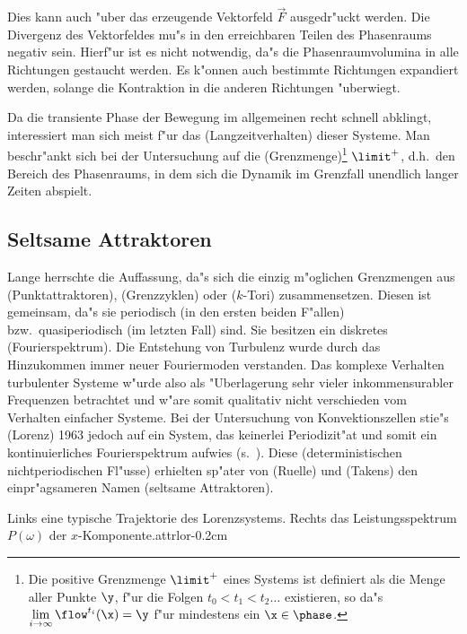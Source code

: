 Dies kann auch "uber das erzeugende Vektorfeld $\vec F$ ausgedr"uckt werden. Die Divergenz
des Vektorfeldes mu"s in den erreichbaren Teilen des Phasenraums negativ sein.
Hierf"ur ist es nicht notwendig, da"s die Phasenraumvolumina in alle Richtungen gestaucht
werden. Es k"onnen auch bestimmte Richtungen expandiert werden, solange die Kontraktion in
die anderen Richtungen "uberwiegt.

Da die transiente Phase der Bewegung im allgemeinen recht schnell abklingt, interessiert
man sich meist f"ur das \begriff(Langzeitverhalten) dieser Systeme. Man beschr"ankt sich bei
der Untersuchung auf die \begriff(Grenzmenge)\footnote{Die positive Grenzmenge $\limit^+$
eines Systems ist definiert als die Menge aller Punkte $\y$, f"ur die  
Folgen $t_0\lt t_1\lt t_2\dots$ existieren, so da"s $\lim\limits_{i\to\infty}\flow^{t_i}(\x)=\y$
f"ur mindestens ein $\x\in\phase$.} $\limit^+$, d.h.\   den Bereich des
Phasenraums, in dem sich die Dynamik im Grenzfall unendlich langer Zeiten abspielt. 

\subsection{Seltsame Attraktoren}
Lange herrschte die Auffassung, da"s sich die einzig m"oglichen Grenzmengen aus
\begriff(Punkt\-attraktoren), \begriff(Grenzzyklen) oder \begriff($k$-Tori)
zusammensetzen. Diesen ist gemeinsam, da"s sie periodisch (in den ersten beiden F"allen)
bzw.\ quasiperiodisch (im letzten Fall) sind. Sie besitzen ein diskretes \begriff(Fourierspektrum).
Die Entstehung von Turbulenz wurde durch das Hinzukommen immer neuer
Fouriermoden verstanden. Das komplexe Verhalten turbulenter Systeme w"urde also als "Uberlagerung
sehr vieler inkommensurabler Frequenzen betrachtet und w"are somit qualitativ nicht verschieden vom
Verhalten einfacher Systeme. Bei der Untersuchung von Konvektionszellen stie"s
\autor(Lorenz) 1963 \cite{Lorenz63} jedoch auf ein System, das keinerlei Periodizit"at
und somit ein kontinuierliches Fourierspektrum aufwies (s.~). Diese 
\begriff(deterministischen nichtperiodischen Fl"usse) erhielten sp"ater von \autor(Ruelle)
und \autor(Takens) \cite{Ruelle71a} den einpr"agsameren Namen \begriff(seltsame Attraktoren). 


{Links eine typische Trajektorie des Lorenzsystems.  Rechts das Leistungsspektrum $P(\omega)$ der 
$x$-Komponente.}{attrlor}{-0.2cm}


